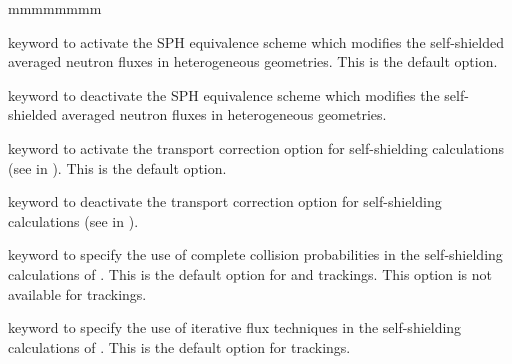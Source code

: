 \begin{ListeDeDescription}{mmmmmmmm}
\item[\moc{SPH}] keyword to activate the SPH equivalence scheme which
modifies the self-shielded averaged neutron fluxes in
heterogeneous geometries. This is the default option.

\item[\moc{NOSP}] keyword to deactivate the SPH equivalence scheme which
modifies the self-shielded averaged neutron fluxes in
heterogeneous geometries.

\item[\moc{TRAN}] keyword to activate the transport correction option for
self-shielding calculations (see  in ). This is the default option.

\item[\moc{NOTR}] keyword to deactivate the transport correction option for
self-shielding calculations (see  in ).

\item[\moc{PIJ}] keyword to specify the use of complete collision
probabilities in the self-shielding calculations of .
This is the default option for  and  trackings.
This option is not available for  trackings.

\item[\moc{ARM}] keyword to specify the use of iterative flux techniques
in the self-shielding calculations of .
This is the default option for  trackings.

\end{ListeDeDescription}
\eject
